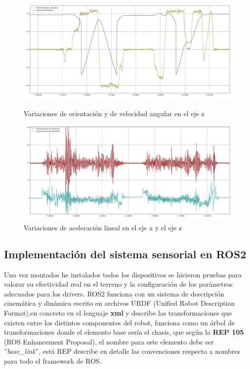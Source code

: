 \begin{figure}[htbp]
  \centering
  \begin{minipage}[b]{0.45\textwidth}
    \centering
    \includegraphics[width=\textwidth]{images/mti_angular_orientation.png}
    \caption{Variaciones de orientación y de velocidad angular en el eje z}
    \label{fig:mti_velocidad_orientacion}
  \end{minipage}
  \hfill
  \begin{minipage}[b]{0.45\textwidth}
    \centering
    \includegraphics[width=\textwidth]{images/mti_Acceleration.png}
    \caption{Variaciones de aceleración lineal en el eje x y el eje z}
    \label{fig:mti_aceleraciones}
  \end{minipage}
\end{figure}

\newpage
\subsection{Implementación del sistema sensorial en ROS2}

Una vez montados he instalados todos los dispositivos se hicieron pruebas para valorar su efectividad real en el terreno y la configuración 
de los parámetros adecuados para los drivers. ROS2 funciona con un sistema de descripción cinemática y dinámica escrito en archivos URDF (Unified Robot Description Format),en concreto en 
el lenguaje \textbf{xml} y describe las transformaciones que existen entre los distintos componentes del robot, funciona como un árbol de 
transformaciones donde el elemento base sería el chasis, que según la \textbf{REP 105} (ROS Enhancement Proposal), el nombre para este 
elemento debe ser ''\textit{base\_link}'', está REP describe en detalle las convenciones respecto a nombres para todo el framework de ROS. 

